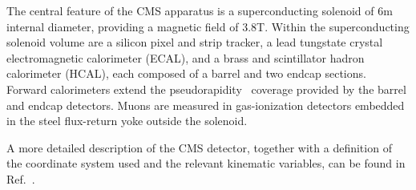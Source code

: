 The central feature of the CMS apparatus is a superconducting solenoid of 6\unit{m} internal diameter, providing a magnetic field of 3.8\unit{T}. Within the superconducting solenoid volume are a silicon pixel and strip tracker, a lead tungstate crystal electromagnetic calorimeter (ECAL), and a brass and scintillator hadron calorimeter (HCAL), each composed of a barrel and two endcap sections. Forward calorimeters extend the pseudorapidity~\cite{Chatrchyan:2008zzk} coverage provided by the barrel and endcap detectors. Muons are measured in gas-ionization detectors embedded in the steel flux-return yoke outside the solenoid.

A more detailed description of the CMS detector, together with a definition of the coordinate system used and the relevant kinematic variables, can be found in Ref.~\cite{Chatrchyan:2008zzk}.
